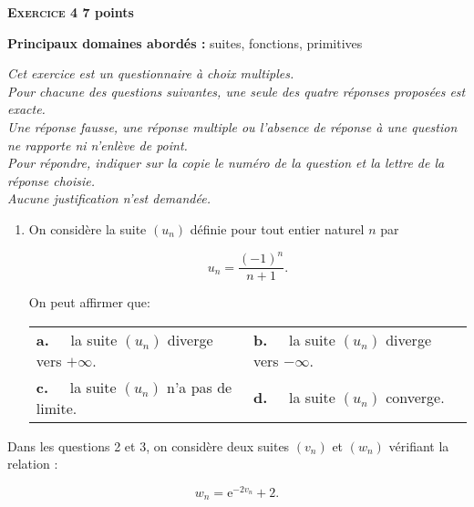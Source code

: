 \documentclass[11pt]{article}
\newcommand{\e}{\text{e}}
\begin{document}
\bigskip

\textbf{\textsc{Exercice 4} \hfill 7 points}

\textbf{Principaux domaines abordés :} suites, fonctions, primitives

\medskip

\emph{Cet exercice est un questionnaire à choix multiples.\\
Pour chacune des questions suivantes, une seule des quatre réponses proposées est exacte.\\
Une réponse fausse, une réponse multiple ou l'absence de réponse à une question ne rapporte ni n'enlève de point.\\
Pour répondre, indiquer sur la copie le numéro de la question et la lettre de la réponse choisie.\\
Aucune justification n'est demandée.}

\medskip

\begin{enumerate}
\item On considère la suite $\left(u_n\right)$ définie pour tout entier naturel $n$ par

\[u_n  = \dfrac{(- 1)^n}{n + 1}.\]

On peut affirmer que:
\begin{center}
\begin{tabularx}{\linewidth}{X X}
\textbf{a.~~} la suite $\left(u_n\right)$ diverge vers $+\infty$. &\textbf{b.~~} la suite $\left(u_n\right)$ diverge vers $-\infty$.\\
\textbf{c.~~}  la suite $\left(u_n\right)$ n'a pas de limite. &\textbf{d.~~} la suite $\left(u_n\right)$ converge.
\end{tabularx}
\end{center}

\begin{center} \decosix \decosix \decosix  \end{center}
\end{enumerate}

Dans les questions 2 et 3, on considère deux suites $\left(v_n\right)$  et $\left(w_n\right)$ vérifiant la relation : 

\[w_n = \e^{- 2v_n} + 2.\]
\end{document}
